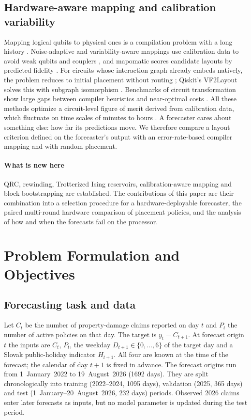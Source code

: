 \documentclass[journal]{IEEEtran}
\begin{document}
\subsection{Hardware-aware mapping and calibration variability}
Mapping logical qubits to physical ones is a compilation problem with a long history \cite{Siraichi2018Allocation,Li2019SABRE}. Noise-adaptive and variability-aware mappings use calibration data to avoid weak qubits and couplers \cite{Murali2019NoiseAdaptive,Tannu2019NotAll,Niu2020HardwareAware}, and mapomatic scores candidate layouts by predicted fidelity \cite{Nation2023Mapomatic}. For circuits whose interaction graph already embeds natively, the problem reduces to initial placement without routing \cite{Steinberg2022Assignment}; Qiskit's VF2Layout solves this with subgraph isomorphism \cite{Cordella2004VF2,JavadiAbhari2024Qiskit}. Benchmarks of circuit transformation show large gaps between compiler heuristics and near-optimal costs \cite{Li2025QKNOB}. All these methods optimize a circuit-level figure of merit derived from calibration data, which fluctuate on time scales of minutes to hours \cite{Klimov2018Fluctuations,Burnett2019Decoherence,Proctor2020Drift}. A forecaster cares about something else: how far its predictions move. We therefore compare a layout criterion defined on the forecaster's output with an error-rate-based compiler mapping and with random placement.

\paragraph*{What is new here} QRC, rewinding, Trotterized Ising reservoirs, calibration-aware mapping and block bootstrapping are established. The contributions of this paper are their combination into a selection procedure for a hardware-deployable forecaster, the paired multi-round hardware comparison of placement policies, and the analysis of how and when the forecasts fail on the processor.

\section{Problem Formulation and Objectives}
\subsection{Forecasting task and data}
Let $C_t$ be the number of property-damage claims reported on day $t$ and $P_t$ the number of active policies on that day. The target is $y_t=C_{t+1}$. At forecast origin $t$ the inputs are $C_t$, $P_t$, the weekday $D_{t+1}\in\{0,\dots,6\}$ of the target day and a Slovak public-holiday indicator $H_{t+1}$. All four are known at the time of the forecast; the calendar of day $t+1$ is fixed in advance. The forecast origins run from 1~January~2022 to 19~August~2026 (1692 days). They are split chronologically into training (2022--2024, 1095 days), validation (2025, 365 days) and test (1~January--20~August~2026, 232 days) periods. Observed 2026 claims enter later forecasts as inputs, but no model parameter is updated during the test period.
\end{document}
